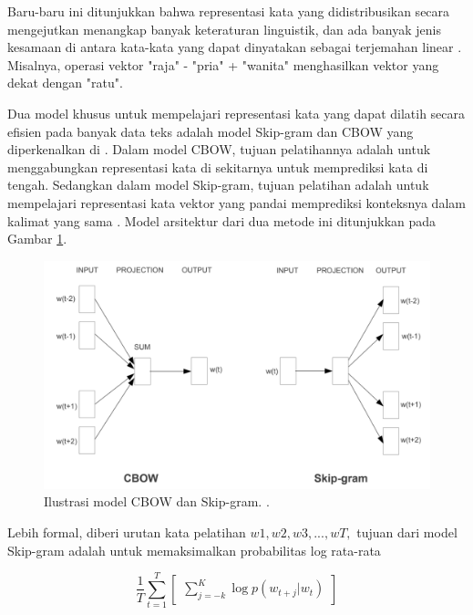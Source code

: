     Baru-baru ini ditunjukkan bahwa representasi kata yang didistribusikan secara mengejutkan menangkap banyak keteraturan linguistik, dan ada banyak jenis kesamaan di antara kata-kata yang dapat dinyatakan sebagai terjemahan linear \parencite{MikolovLinguistic2013}. Misalnya, operasi vektor "raja" - "pria" + "wanita" menghasilkan vektor yang dekat dengan "ratu".

    Dua model khusus untuk mempelajari representasi kata yang dapat dilatih secara efisien pada banyak data teks adalah model Skip-gram dan CBOW yang diperkenalkan di \parencite{MikolovEstimation}. Dalam model CBOW, tujuan pelatihannya adalah untuk menggabungkan representasi kata di sekitarnya untuk memprediksi kata di tengah. Sedangkan dalam model Skip-gram, tujuan pelatihan adalah untuk mempelajari representasi kata vektor yang pandai memprediksi konteksnya dalam kalimat yang sama \parencite{MikolovEstimation}. Model arsitektur dari dua metode ini ditunjukkan pada Gambar \ref{fig:ilustrasi_cbow_skip_gram}.

    \begin{figure}[ht]
        \centering
        \includegraphics[width=1\textwidth]{resources/cbow-skip-gram-illustration.png}
        \caption{Ilustrasi model CBOW dan Skip-gram. \parencite{MikolovExploiting}.}
        \label{fig:ilustrasi_cbow_skip_gram}
    \end{figure}
    
    Lebih formal, diberi urutan kata pelatihan \(w1, w2, w3,. . . , wT,\) tujuan dari model Skip-gram adalah untuk memaksimalkan probabilitas log rata-rata

    \begin{equation}
        \frac{1}{T}\sum_{t=1}^{T}\begin{bmatrix}
        \sum_{j=-k}^{K}{\log p(w_{t+j}|w_{t})}
        \end{bmatrix}
        \label{eq:1}
    \end{equation}

